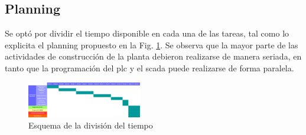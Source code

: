 \subsection{Planning}
Se optó por dividir el tiempo disponible en cada una de las tareas, tal como lo
explicita el planning propuesto en la Fig. \ref{fig:EDT}.
Se observa que la mayor parte de las actividades de construcción de la planta
debieron realizarse de manera seriada, en tanto que la programación del
\gls{plc} y el \gls{scada} puede realizarse de forma paralela.
\begin{figure}[ht!]
	\centering
	\includegraphics[angle=-90,
		width=0.445\textwidth]{Cap1-Introduccion/images/EDT.pdf}
	\caption{Esquema de la división del tiempo}
	\label{fig:EDT}
\end{figure}
